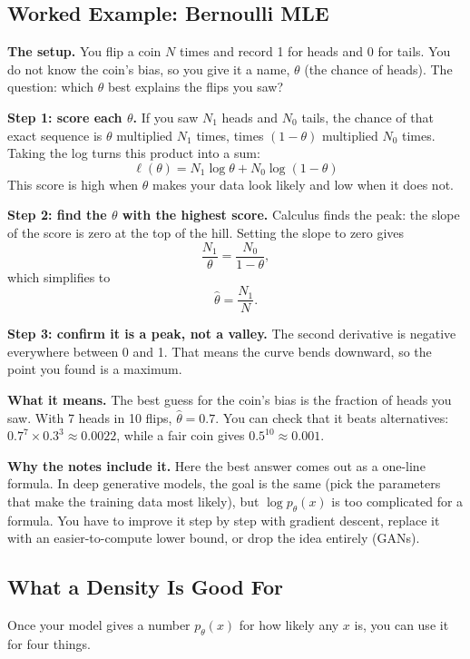 \subsection*{Worked Example: Bernoulli MLE}

\textbf{The setup.} You flip a coin $N$ times and record 1 for heads and 0 for tails. You do not know the coin's bias, so you give it a name, $\theta$ (the chance of heads). The question: which $\theta$ best explains the flips you saw?

\textbf{Step 1: score each $\theta$.} If you saw $N_1$ heads and $N_0$ tails, the chance of that exact sequence is $\theta$ multiplied $N_1$ times, times $(1-\theta)$ multiplied $N_0$ times. Taking the log turns this product into a sum:
\[
\ell(\theta) = N_1 \log \theta + N_0 \log(1-\theta)
\]
This score is high when $\theta$ makes your data look likely and low when it does not.

\textbf{Step 2: find the $\theta$ with the highest score.} Calculus finds the peak: the slope of the score is zero at the top of the hill. Setting the slope to zero gives
\[
\frac{N_1}{\theta} = \frac{N_0}{1-\theta},
\]
which simplifies to
\[
\hat{\theta} = \frac{N_1}{N}.
\]

\textbf{Step 3: confirm it is a peak, not a valley.} The second derivative is negative everywhere between 0 and 1. That means the curve bends downward, so the point you found is a maximum.

\textbf{What it means.} The best guess for the coin's bias is the fraction of heads you saw. With 7 heads in 10 flips, $\hat{\theta} = 0.7$. You can check that it beats alternatives: $0.7^7 \times 0.3^3 \approx 0.0022$, while a fair coin gives $0.5^{10} \approx 0.001$.

\textbf{Why the notes include it.} Here the best answer comes out as a one-line formula. In deep generative models, the goal is the same (pick the parameters that make the training data most likely), but $\log p_\theta(x)$ is too complicated for a formula. You have to improve it step by step with gradient descent, replace it with an easier-to-compute lower bound, or drop the idea entirely (GANs).

\subsection*{What a Density Is Good For}

Once your model gives a number $p_\theta(x)$ for how likely any $x$ is, you can use it for four things.

